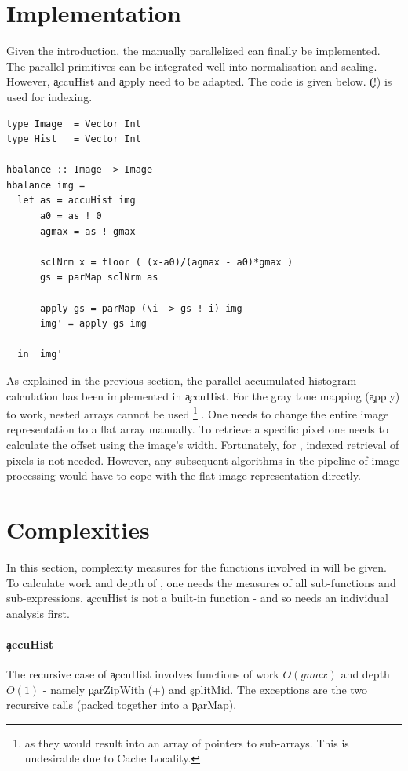 \section{Implementation}
  Given the introduction, the manually parallelized \man can finally be implemented.
  The parallel primitives can be integrated
  well into normalisation and scaling.
  However, \c{accuHist} and \c{apply} need to be adapted.
  The code is given below. \c{(!)} is used for indexing.
  \begin{lstlisting}
type Image  = Vector Int
type Hist   = Vector Int

hbalance :: Image -> Image
hbalance img =
  let as = accuHist img
      a0 = as ! 0
      agmax = as ! gmax
      
      sclNrm x = floor ( (x-a0)/(agmax - a0)*gmax )
      gs = parMap sclNrm as
      
      apply gs = parMap (\i -> gs ! i) img
      img' = apply gs img
      
  in  img'
  \end{lstlisting}
  As explained in the previous section, the parallel
  accumulated histogram calculation has been implemented in \c{accuHist}.
  For the gray tone mapping (\c{apply}) to work, nested arrays cannot be used
  \footnote{as they would result into an array of pointers to sub-arrays.
  This is undesirable due to Cache Locality.}
  .
  One needs to change the entire image representation to a flat array manually.
  To retrieve a specific pixel one needs to calculate
  the offset using the image's width. Fortunately,
  for \algo, indexed retrieval of pixels is not needed.
  However, any subsequent algorithms in the pipeline of image processing
  would have to cope with the flat image representation directly.
    
\section{Complexities}
  In this section, complexity measures for the functions
  involved in \man will be given.
  To calculate work and depth of \man, one needs the measures of
  all sub-functions and sub-expressions. \c{accuHist} is
  not a built-in function - and so needs an individual analysis first.
  
  \paragraph{\c{accuHist}}
    The recursive case of \c{accuHist} involves functions
    of work $O(gmax)$ and depth $O(1)$ - 
    namely \c{parZipWith (+)} and \c{splitMid}.
    The exceptions are the two recursive calls (packed together into a
    \c{parMap}).
    
